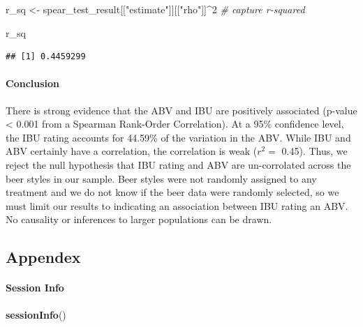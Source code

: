 \documentclass[]{article}
\newenvironment{Shaded}{\begin{snugshade}}{\end{snugshade}}
\newcommand{\KeywordTok}[1]{\textcolor[rgb]{0.13,0.29,0.53}{\textbf{#1}}}
\newcommand{\DecValTok}[1]{\textcolor[rgb]{0.00,0.00,0.81}{#1}}
\newcommand{\StringTok}[1]{\textcolor[rgb]{0.31,0.60,0.02}{#1}}
\newcommand{\CommentTok}[1]{\textcolor[rgb]{0.56,0.35,0.01}{\textit{#1}}}
\newcommand{\OperatorTok}[1]{\textcolor[rgb]{0.81,0.36,0.00}{\textbf{#1}}}
\newcommand{\NormalTok}[1]{#1}
\let\oldparagraph\paragraph
\renewcommand{\paragraph}[1]{\oldparagraph{#1}\mbox{}}
\begin{document}
\begin{Shaded}
\begin{Highlighting}[]
\NormalTok{r_sq <-}\StringTok{ }\NormalTok{spear_test_result[[}\StringTok{"estimate"}\NormalTok{]][[}\StringTok{"rho"}\NormalTok{]]}\OperatorTok{^}\DecValTok{2} \CommentTok{# capture r-squared}

\NormalTok{r_sq}
\end{Highlighting}
\end{Shaded}

\begin{verbatim}
## [1] 0.4459299
\end{verbatim}

\paragraph{Conclusion}\label{conclusion}

There is strong evidence that the ABV and IBU are positively associated
(p-value \textless{} 0.001 from a Spearman Rank-Order Correlation). At a
95\% confidence level, the IBU rating accounts for 44.59\% of the
variation in the ABV. While IBU and ABV certainly have a correlation,
the correlation is weak (\(r^2 =\) 0.45). Thus, we reject the null
hypothesis that IBU rating and ABV are un-corrolated across the beer
styles in our sample. Beer styles were not randomly assigned to any
treatment and we do not know if the beer data were randomly selected, so
we must limit our results to indicating an association between IBU
rating an ABV. No causality or inferences to larger populations can be
drawn.

\subsection{Appendex}\label{appendex}

\paragraph{Session Info}\label{session-info}

\begin{Shaded}
\begin{Highlighting}[]
\KeywordTok{sessionInfo}\NormalTok{()}
\end{Highlighting}
\end{Shaded}
\end{document}
